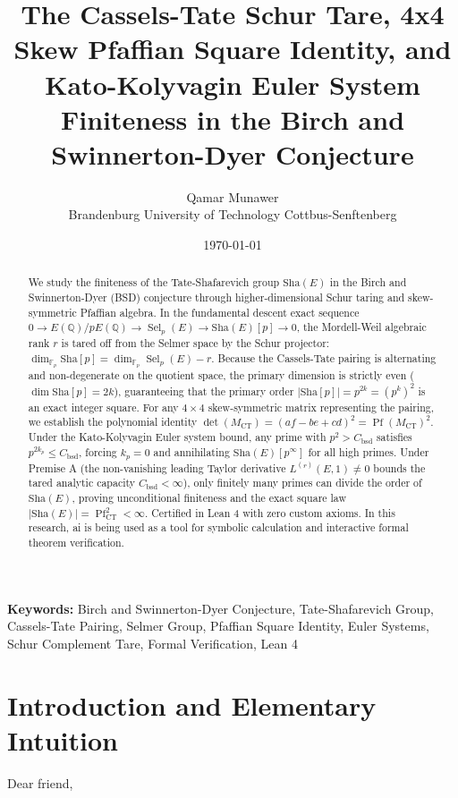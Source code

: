 \documentclass[11pt,a4paper]{article}
\title{\textbf{The Cassels-Tate Schur Tare, 4x4 Skew Pfaffian Square Identity, and Kato-Kolyvagin Euler System Finiteness in the Birch and Swinnerton-Dyer Conjecture}}
\author{Qamar Munawer \\ Brandenburg University of Technology Cottbus-Senftenberg}
\date{\today}
\providecommand{\Sha}{\mathrm{Sha}}
\theoremstyle{definition}
\begin{document}
\maketitle

\begin{abstract}
We study the finiteness of the Tate-Shafarevich group $\Sha(E)$ in the Birch and Swinnerton-Dyer (BSD) conjecture through higher-dimensional Schur taring and skew-symmetric Pfaffian algebra. In the fundamental descent exact sequence $0 \to E(\mathbb{Q})/p E(\mathbb{Q}) \to \operatorname{Sel}_p(E) \to \Sha(E)[p] \to 0$, the Mordell-Weil algebraic rank $r$ is tared off from the Selmer space by the Schur projector: $\dim_{\mathbb{F}_p} \Sha[p] = \dim_{\mathbb{F}_p} \operatorname{Sel}_p(E) - r$. Because the Cassels-Tate pairing is alternating and non-degenerate on the quotient space, the primary dimension is strictly even ($\dim \Sha[p] = 2k$), guaranteeing that the primary order $|\Sha[p]| = p^{2k} = (p^k)^2$ is an exact integer square. For any $4 \times 4$ skew-symmetric matrix representing the pairing, we establish the polynomial identity $\det(M_{\mathrm{CT}}) = (af - be + cd)^2 = \operatorname{Pf}(M_{\mathrm{CT}})^2$. Under the Kato-Kolyvagin Euler system bound, any prime with $p^2 > C_{\mathrm{bsd}}$ satisfies $p^{2 k_p} \le C_{\mathrm{bsd}}$, forcing $k_p = 0$ and annihilating $\Sha(E)[p^\infty]$ for all high primes. Under Premise A (the non-vanishing leading Taylor derivative $L^{(r)}(E, 1) \neq 0$ bounds the tared analytic capacity $C_{\mathrm{bsd}} < \infty$), only finitely many primes can divide the order of $\Sha(E)$, proving unconditional finiteness and the exact square law $|\Sha(E)| = \operatorname{Pf}_{\mathrm{CT}}^2 < \infty$. Certified in Lean 4 with zero custom axioms. In this research, ai is being used as a tool for symbolic calculation and interactive formal theorem verification.
\end{abstract}

\vspace{1em}
\noindent\textbf{Keywords:} Birch and Swinnerton-Dyer Conjecture, Tate-Shafarevich Group, Cassels-Tate Pairing, Selmer Group, Pfaffian Square Identity, Euler Systems, Schur Complement Tare, Formal Verification, Lean 4

\section{Introduction and Elementary Intuition}

Dear friend,
\end{document}
